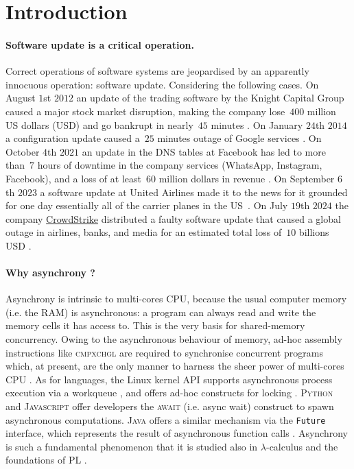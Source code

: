 \newcommand{\erlang}{\href{https://www.erlang.org/faq/introduction.html}{\textsf{Erlang}}\xspace}
\newcommand{\elixir}{\href{https://elixir-lang.org/}{\textsf{Elixir}}\xspace}


\section{Introduction}
\label{sec:intro}

\paragraph{Software update is a critical operation.}
Correct operations of software systems are jeopardised by an
apparently innocuous operation:
software update. Considering the following cases. %
On August $1$st $2012$ an update of the trading software by the Knight
Capital Group caused a major stock market disruption, making the
company lose~$400$ million US dollars (USD) and go bankrupt in
nearly~$45$ minutes \cite{knightmare,WkKnightmare}.
On January $24$th $2014$ a configuration update caused a~$25$ minutes
outage of Google services \cite{WkGoogle}.
On October $4$th $2021$ an update in the DNS tables at Facebook has led
to more than~$7$ hours of downtime in the company services (WhatsApp,
Instagram, Facebook), and a loss of at least~$60$ million
dollars in revenue \cite{facebook}.
On September $6$th $2023$ a software update at
United Airlines made it to the news for it grounded for one day
essentially all of the carrier planes in the
US~\cite{update-grounded-flights}.
On July $19$th $2024$ the company \href{https://www.crowdstrike.com/}{CrowdStrike} 
distributed a faulty software update that caused a global outage
in airlines, banks, and media for an estimated total loss of~$10$
billions USD \cite{WkCrowd}.



\paragraph{Why asynchrony ?}
Asynchrony is intrinsic to multi-cores CPU, because
the usual computer memory (i.e. the RAM) is asynchronous:
a program can always read and write the memory cells it
has access to. This is the very basis for shared-memory concurrency.
Owing to the asynchronous behaviour of memory, ad-hoc assembly
instructions like \textsc{cmpxchgl} \cite{WkCAS} are required to
synchronise concurrent programs which, at present, are
the only manner to harness the sheer power of multi-cores CPU
\cite{doi:10.1126/science.aam9744}.
As for languages, the Linux kernel API supports asynchronous process execution via a workqueue \cite{workqueue}, and offers ad-hoc
constructs for locking \cite{locktypes}.
\textsc{Python} and \textsc{Javascript} offer developers the
\textsc{await} (i.e. async wait) construct to spawn asynchronous
computations. \textsc{Java} offers a similar mechanism via the 
\texttt{Future} interface, which represents the result of asynchronous
function calls \cite{java.future}.
Asynchrony is such a fundamental phenomenon that it is studied also
in $\lambda$-calculus and the foundations of PL \cite{DBLP:journals/lmcs/AhmanP24}.


